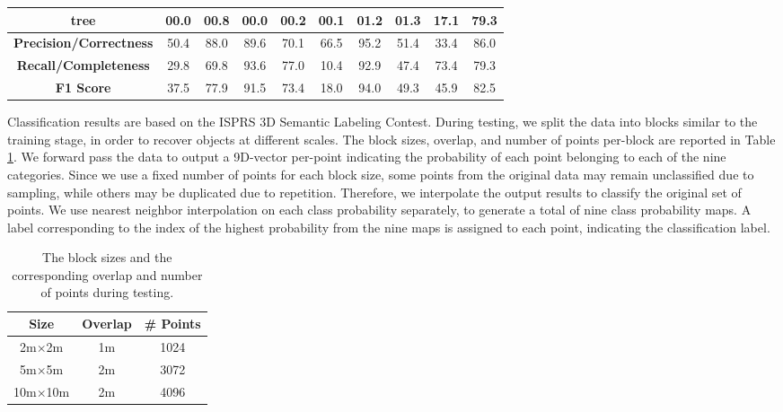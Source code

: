 \documentclass[final,3p,times,twocolumn,authoryear]{elsarticle}
\newcommand{\mxy}[1]{ \color{red}{#1}}
\begin{document}
\begin{table*}[t]
\begin{tabular}{c|ccccccccc}
\multicolumn{1}{c|}{\textbf{tree}}                  & 00.0          & 00.8             & 00.0              & 00.2          & 00.1                 & 01.2          & 01.3          & 17.1          & \textbf{79.3} \\ \hline
\multicolumn{1}{c|}{\textbf{Precision/Correctness}} & 50.4          & 88.0             & 89.6              & 70.1          & 66.5                 & 95.2          & 51.4          & 33.4          & 86.0 \\
\multicolumn{1}{c|}{\textbf{Recall/Completeness}}   & 29.8          & 69.8             & 93.6              & 77.0          & 10.4                 & 92.9          & 47.4          & 73.4          & 79.3 \\
\multicolumn{1}{c|}{\textbf{F1 Score}}              & 37.5          & 77.9             & 91.5              & 73.4          & 18.0                 & 94.0          & 49.3          & 45.9          & 82.5 \\ \hline
\end{tabular}
\end{table*}
Classification results are based on the ISPRS 3D Semantic Labeling Contest.
During testing, we split the data into blocks similar to the training stage, in order to recover objects at different scales. 
The block sizes, overlap, and number of points per-block are reported in Table \ref{tab:blocks}. %
We forward pass the data to output a 9D-vector per-point indicating the probability of each point belonging to each of the nine categories. 
Since we use a fixed number of points for each block size, some points from the original data may remain unclassified due to sampling, while others may be duplicated due to repetition. 
Therefore, we interpolate the output results to classify the original set of points. 
We use nearest neighbor interpolation on each class probability separately, to generate a total of nine class probability maps. %
A label corresponding to the index of the highest probability from the nine maps is assigned to each point, indicating the classification label.
\begin{table}[t]
\centering
\caption{The block sizes and the corresponding overlap and number of points during testing.}
\label{tab:blocks}
\begin{tabular}{c|c|c}
\textbf{Size} & \textbf{Overlap} & \textbf{\# Points} \\ \hline %
2m$\times$2m            & 1m                   & 1024 \\        %
5m$\times$5m            & 2m                   & 3072 \\        %
10m$\times$10m           & 2m                   & 4096\\ \hline %
\end{tabular}
\end{table}
\end{document}
